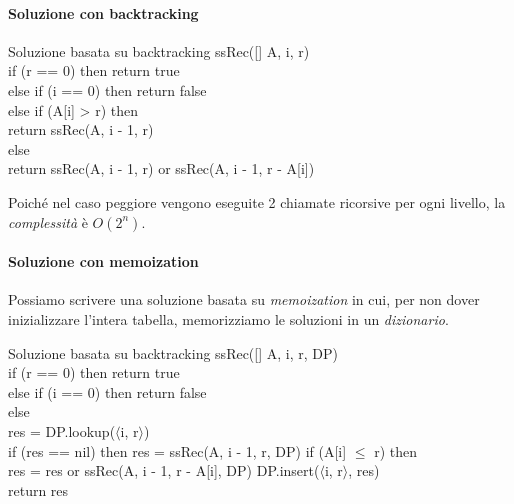 \paragraph{Soluzione con backtracking}
\begin{minicode}{Soluzione basata su backtracking}
\ind{} ssRec([] A,  i,  r)\\
    \indf if (r == 0) then\hfill{}
        return true\\
    \indf else if (i == 0) then\hfill{}
        return false\\
    \indf else if (A[i] > r) then\\
        return ssRec(A, i - 1, r)\\
    \indf else \\
        return ssRec(A, i - 1, r) or ssRec(A, i - 1, r - A[i])
\end{minicode}

\noindent
Poiché nel caso peggiore vengono eseguite 2 chiamate ricorsive per ogni livello,
la \emph{complessità} è $O(2^n)$.

\paragraph{Soluzione con memoization}
Possiamo scrivere una soluzione basata su \emph{memoization} in cui, per non
dover inizializzare l'intera tabella, memorizziamo le soluzioni in un \emph{dizionario}.

\begin{minicode}{Soluzione basata su backtracking}
    \ind{} ssRec([] A,  i,  r,  DP)\\
        \indf if (r == 0) then\hfill{}
            return true\\
        \indf else if (i == 0) then\hfill{}
            return false\\
        \indf else\\
             res = DP.lookup($\langle$i, r$\rangle$)\\
            \indff if (res == nil) then\hfill{}
                res = ssRec(A, i - 1, r, DP)\hfill{}
                \indfff if (A[i] $\leq$ r) then\\
                    res = res or ssRec(A, i - 1, r - A[i], DP)\hfill{}
                \indfff DP.insert($\langle$i, r$\rangle$, res)\\
            \indff return res
\end{minicode}

